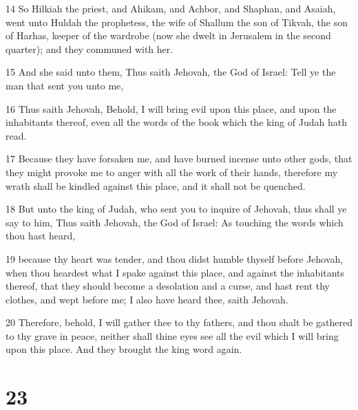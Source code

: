 \par 14 So Hilkiah the priest, and Ahikam, and Achbor, and Shaphan, and Asaiah, went unto Huldah the prophetess, the wife of Shallum the son of Tikvah, the son of Harhas, keeper of the wardrobe (now she dwelt in Jerusalem in the second quarter); and they communed with her.
\par 15 And she said unto them, Thus saith Jehovah, the God of Israel: Tell ye the man that sent you unto me,
\par 16 Thus saith Jehovah, Behold, I will bring evil upon this place, and upon the inhabitants thereof, even all the words of the book which the king of Judah hath read.
\par 17 Because they have forsaken me, and have burned incense unto other gods, that they might provoke me to anger with all the work of their hands, therefore my wrath shall be kindled against this place, and it shall not be quenched.
\par 18 But unto the king of Judah, who sent you to inquire of Jehovah, thus shall ye say to him, Thus saith Jehovah, the God of Israel: As touching the words which thou hast heard,
\par 19 because thy heart was tender, and thou didst humble thyself before Jehovah, when thou heardest what I spake against this place, and against the inhabitants thereof, that they should become a desolation and a curse, and hast rent thy clothes, and wept before me; I also have heard thee, saith Jehovah.
\par 20 Therefore, behold, I will gather thee to thy fathers, and thou shalt be gathered to thy grave in peace, neither shall thine eyes see all the evil which I will bring upon this place. And they brought the king word again.

\chapter{23}

